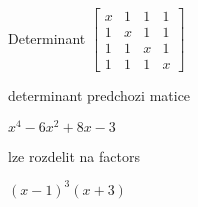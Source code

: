 \documentclass[12pt]{article}
\begin{document}
    Determinant
    \begin{math}
        \left[\begin{matrix}x & 1 & 1 & 1\\1 & x & 1 & 1\\1 & 1 & x & 1\\1 & 1 & 1 & x\end{matrix}\right]
    \end{math}

    determinant predchozi matice

    \begin{math}
        x^{4} - 6 x^{2} + 8 x - 3
    \end{math}

    lze rozdelit na factors

    \begin{math}
        \left(x - 1\right)^{3} \left(x + 3\right)
    \end{math}
\end{document}
